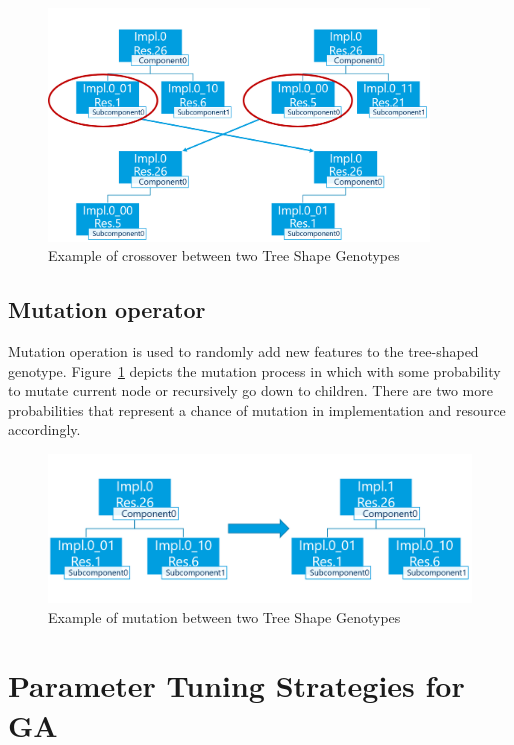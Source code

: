\begin{figure}
	\centering
	\includegraphics[width=0.9\textwidth]{images/GeneticSolverCrossover.png}
	\caption[Crossover in Tree Shape Genotype]{Example of crossover between two Tree Shape Genotypes}
	\label{fig:GeneticSolverCrossover}
\end{figure}



\subsection{Mutation operator}
\label{sec:GeneticSolverMutation}
Mutation operation is used to randomly add new features to the tree-shaped genotype. Figure~\ref{fig:GeneticSolverCrossover} depicts the mutation process in which with some probability to mutate current node or recursively go down to children.
There are two more probabilities that represent a chance of mutation in implementation and resource accordingly. 

\begin{figure}
	\centering
	\includegraphics[width=\textwidth]{images/GeneticSolverMutation.png}
	\caption[Mutation in Tree Shape Genotype]{Example of mutation between two Tree Shape Genotypes}
	\label{fig:GeneticSolverMutation}
\end{figure}

\section{Parameter Tuning Strategies for GA}\label{sec:Parameter Tuning Strategies}


